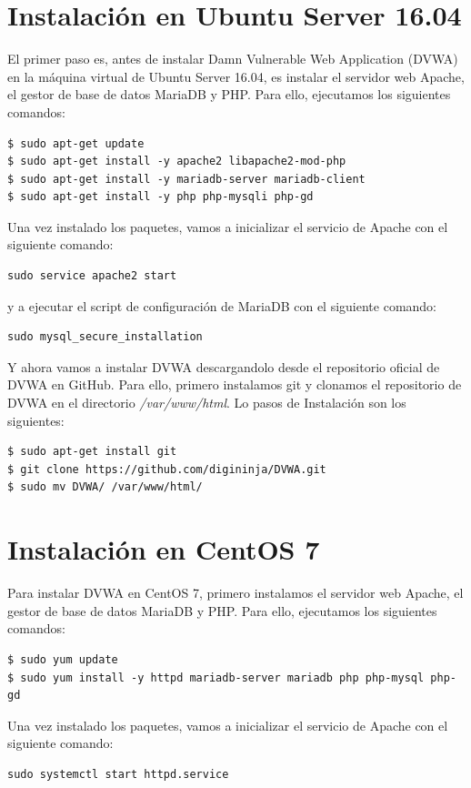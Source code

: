\documentclass[11pt]{report}
\begin{document}
\section{Instalación en Ubuntu Server 16.04}
El primer paso es, antes de instalar Damn Vulnerable Web Application (DVWA) en la máquina virtual de Ubuntu Server 16.04,
es instalar el servidor web Apache, el gestor de base de datos MariaDB y PHP. Para ello, ejecutamos
los siguientes comandos:
\begin{verbatim}
$ sudo apt-get update
$ sudo apt-get install -y apache2 libapache2-mod-php
$ sudo apt-get install -y mariadb-server mariadb-client 
$ sudo apt-get install -y php php-mysqli php-gd 
\end{verbatim}

Una vez instalado los paquetes, vamos a inicializar el servicio de Apache con el siguiente comando:
\begin{BVerbatim}
sudo service apache2 start
\end{BVerbatim}

y a ejecutar el script de configuración de MariaDB con el siguiente comando:
\begin{BVerbatim}
sudo mysql_secure_installation
\end{BVerbatim}

Y ahora vamos a instalar DVWA descargandolo desde el repositorio oficial de DVWA en GitHub. Para ello, primero instalamos git y clonamos el repositorio de DVWA en el directorio
\emph{/var/www/html}. Lo pasos de Instalación son los siguientes:
\begin{verbatim}
$ sudo apt-get install git
$ git clone https://github.com/digininja/DVWA.git
$ sudo mv DVWA/ /var/www/html/
\end{verbatim}

\section{Instalación en CentOS 7}
Para instalar DVWA en CentOS 7, primero instalamos el servidor web Apache, el gestor de base de datos MariaDB y PHP. Para ello, ejecutamos
los siguientes comandos:
\begin{verbatim}
$ sudo yum update
$ sudo yum install -y httpd mariadb-server mariadb php php-mysql php-gd
\end{verbatim}

Una vez instalado los paquetes, vamos a inicializar el servicio de Apache con el siguiente comando:
\begin{BVerbatim}
sudo systemctl start httpd.service
\end{BVerbatim}
\end{document}
